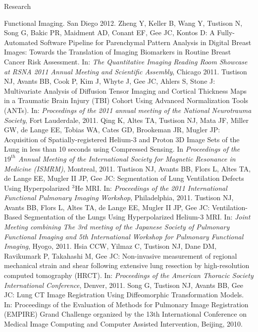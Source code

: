 \documentclass{resume}
\begin{document}
\begin{category}{Research}
\begin{itemize}
{   Functional Imaging}. San Diego 2012.   
   \citemnobullet 
   Zheng Y, Keller B, Wang Y, Tustison N, Song G, Bakic PR, Maidment AD, Conant EF, Gee JC, Kontos D:
   A Fully-Automated Software Pipeline for Parenchymal Pattern Analysis in Digital Breast Images:
   Towards the Translation of Imaging Biomarkers in Routine Breast Cancer Risk Assessment.  In: 
   {\em The Quantitative Imaging Reading Room Showcase at RSNA 2011 Annual Meeting and Scientific Assembly}, 
   Chicago 2011.
   \citemnobullet Tustison NJ, Avants BB, Cook P, Kim J, Whyte J, Gee JC, Ahlers S, Stone J:  Multivariate
   Analysis of Diffusion Tensor Imaging and Cortical Thickness Maps in a Traumatic Brain Injury (TBI)
   Cohort Using Advanced Normalization Tools (ANTs).  In: {\em Proceedings of the 2011 
   annual meeting of the National Neurotrauma Society}, Fort Lauderdale, 2011.
   \citemnobullet Qing K, Altes TA, Tustison NJ, Mata JF, Miller GW, de Lange EE, Tobias WA, Cates GD, Brookeman JR,
   Mugler JP:  Acquisition of Spatially-registered Helium-3 and Proton 3D Image Sets of the Lung in less than 10 seconds using Compressed Sensing.  In {\em Proceedings of the $19^{th}$ Annual Meeting of the International Society for Magnetic Resonance in Medicine (ISMRM)}, Montreal, 2011.
   \citemnobullet Tustison NJ, Avants BB, Flors L, Altes TA, de Lange EE, Mugler II JP, Gee JC: Segmentation of Lung Ventilation Defects Using Hyperpolarized $^3$He MRI.  In:  {\em Proceedings of the 2011 International Functional Pulmonary Imaging Workshop}, Philadelphia, 2011.
   \citemnobullet Tustison NJ, Avants BB, Flors L, Altes TA, de Lange EE, Mugler II JP, Gee JC: Ventilation-Based Segmentation of the Lungs Using Hyperpolarized Helium-3 MRI.  In:  {\em Joint Meeting combining The 3rd meeting of the Japanese Society of Pulmonary Functional Imaging and 5th International Workshop for Pulmonary  Functional  Imaging}, Hyogo, 2011.
    \citemnobullet Hsia CCW, Yilmaz C, Tustison NJ, Dane DM, Ravikumark P, Takahashi M, Gee JC:  Non-invasive measurement of regional mechanical strain and shear following extensive lung resection by high-resolution computed tomography (HRCT).  In: {\em Proceedings of the American Thoracic Society International Conference}, Denver, 2011.
    \citemnobullet Song G, Tustison NJ, Avants BB, Gee JC:  Lung CT Image Registration Using Diffeomorphic Transformation Models. In: {Proceedings of the Evaluation of Methods for Pulmonary Image Registration (EMPIRE) Grand Challenge organized by the 13th International Conference on Medical Image Computing and Computer Assisted Intervention}, Beijing, 2010.

\end{itemize}
\end{category}
\end{document}
